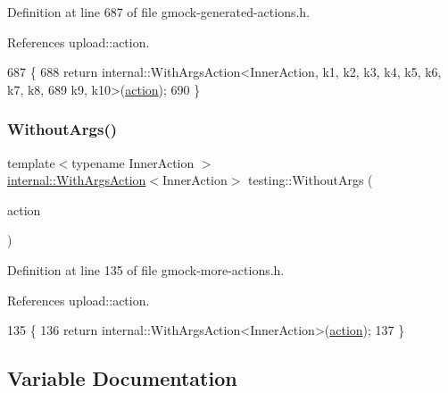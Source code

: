 Definition at line 687 of file gmock-\/generated-\/actions.\+h.



References upload\+::action.


\begin{DoxyCode}
687                                     \{
688   \textcolor{keywordflow}{return} internal::WithArgsAction<InnerAction, k1, k2, k3, k4, k5, k6, k7, k8,
689       k9, k10>(\hyperlink{namespaceupload_a675d13c979f1c720866d22ed1736f580}{action});
690 \}
\end{DoxyCode}
\mbox{\label{namespacetesting_aeac85f74bd11112f69142e92e3a50780}} 
\subsubsection{\texorpdfstring{Without\+Args()}{WithoutArgs()}}
{\footnotesize\ttfamily template$<$typename Inner\+Action $>$ \\
\hyperlink{classtesting_1_1internal_1_1WithArgsAction}{internal\+::\+With\+Args\+Action}$<$Inner\+Action$>$ testing\+::\+Without\+Args (\begin{DoxyParamCaption}\item[{const Inner\+Action \&}]{action }\end{DoxyParamCaption})\hspace{0.3cm}{\ttfamily [inline]}}



Definition at line 135 of file gmock-\/more-\/actions.\+h.



References upload\+::action.


\begin{DoxyCode}
135                                        \{
136   \textcolor{keywordflow}{return} internal::WithArgsAction<InnerAction>(\hyperlink{namespaceupload_a675d13c979f1c720866d22ed1736f580}{action});
137 \}
\end{DoxyCode}


\subsection{Variable Documentation}
\mbox{\label{namespacetesting_a4ba77a3f5b67166ff1b59d96a32346a2}} 
